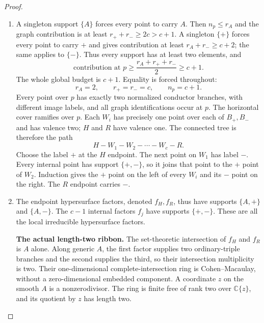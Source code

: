 \begin{proof}
\begin{enumerate}[label={$\langle1\rangle$\arabic*.},leftmargin=*]
\item A singleton support $\{A\}$ forces every point to
carry $A$. Then $n_p\le r_A$ and the graph
contribution is at least $r_++r_-\ge2c>c+1$.
A singleton $\{+\}$ forces every point to carry
$+$ and gives contribution at least
$r_A+r_-\ge c+2$; the same applies to $\{-\}$.
Thus every support has at least two elements, and
\[
 \text{contribution at }p
       \ge\frac{r_A+r_++r_-}{2}\ge c+1.
\]
The whole global budget is $c+1$. Equality is
forced throughout:
\[
                 r_A=2,\qquad r_+=r_-=c,\qquad n_p=c+1.
                                                               \tag{R20.2}
\]
Every point over $p$ has exactly two normalized
conductor branches, with different image labels,
and all graph identifications occur at $p$.
The horizontal cover ramifies over $p$.
Each $W_i$ has precisely one point over each of
$B_+,B_-$ and has valence two; $H$ and $R$ have
valence one. The connected tree is therefore
the path
\[
                    H-W_1-W_2-\cdots-W_c-R.             \tag{R20.3}
\]
Choose the label $+$ at the $H$ endpoint. The next
point on $W_1$ has label $-$. Every internal point
has support $\{+,-\}$, so it joins that point to
the $+$ point of $W_2$. Induction gives the $+$
point on the left of every $W_i$ and its $-$
point on the right. The $R$ endpoint carries $-$.

\item The endpoint hypersurface factors, denoted
$f_H,f_R$, thus have supports $\{A,+\}$ and
$\{A,-\}$. The $c-1$ internal factors $f_j$
have supports $\{+,-\}$. These are all the local
irreducible hypersurface factors.

\par\medskip\noindent\textbf{The actual length-two ribbon.}
The set-theoretic intersection of $f_H$ and $f_R$
is $A$ alone. Along generic $A$, the first factor
supplies two ordinary-triple branches and the
second supplies the third, so their intersection
multiplicity is two. Their one-dimensional
complete-intersection ring is Cohen--Macaulay,
without a zero-dimensional embedded component.
A coordinate $z$ on the smooth $A$ is a
nonzerodivisor. The ring is finite free of rank
two over $\mathbb C\{z\}$, and its quotient by
$z$ has length two.


\end{enumerate}
\end{proof}

